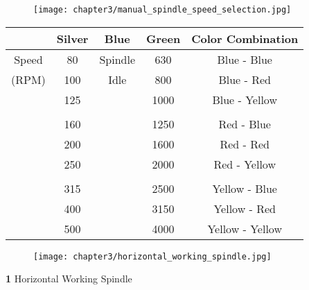 \begin{figure}[h]
    \centering
    \texttt{[image: chapter3/manual\_spindle\_speed\_selection.jpg]}
    \label{fig:manual_spindle_speed_selection}
\end{figure}

\begin{table}[h]
    \centering
    \renewcommand{\arraystretch}{1.3}
    \begin{tabular}{|c|c|c|c|c|}
        \hline \hline
        \textbf{} & \textbf{Silver} & \textbf{Blue} & \textbf{Green} & \textbf{Color Combination} \\
        \hline \hline
        Speed   & 80    &   Spindle & 630  & Blue - Blue  \\
        (RPM)   & 100   &   Idle    & 800  & Blue - Red   \\
                & 125   &           & 1000 & Blue - Yellow \\
                &       &           &       &               \\
                & 160   &           & 1250 & Red - Blue  \\
                & 200   &           & 1600 & Red - Red   \\
                & 250   &           & 2000 & Red - Yellow \\
                &       &           &       &               \\
                & 315   &           & 2500 & Yellow - Blue \\
                & 400   &           & 3150 & Yellow - Red  \\
                & 500   &           & 4000 & Yellow - Yellow \\
        \hline \hline
    \end{tabular}
    \label{tab:spindle_speed}
\end{table}


\begin{figure}[h]
    \centering
    \texttt{[image: chapter3/horizontal\_working\_spindle.jpg]}
    \label{fig:horizontal_working_spindle}
\end{figure}

\textbf{1} \quad Horizontal Working Spindle

\vspace{.5cm}


